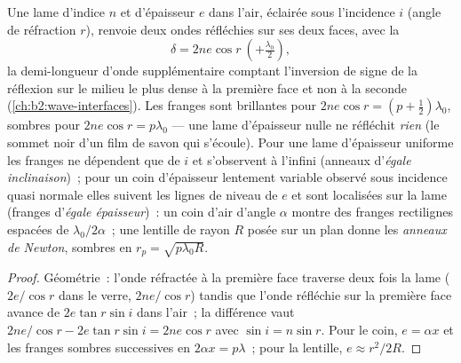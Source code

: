 \begin{proposition}\label{prop:b2:two-wave-interference:film}
Une lame d'indice $n$ et d'épaisseur $e$ dans l'air, éclairée sous l'incidence $i$
(angle de réfraction $r$), renvoie deux ondes réfléchies sur ses deux faces,
avec la 
\[
\delta = 2ne\cos r \ (+\tfrac{\lambda_0}2) ,
\]
la demi-longueur d'onde supplémentaire comptant l'inversion de signe de la réflexion
sur le milieu le plus dense à la première face et non à la seconde
(\cref{ch:b2:wave-interfaces}). Les franges sont brillantes pour $2ne\cos r =
(p + \tfrac12)\lambda_0$, sombres pour $2ne\cos r = p\lambda_0$ --- une lame d'épaisseur
nulle ne réfléchit \emph{rien} (le sommet noir d'un film de savon qui s'écoule).
Pour une lame d'épaisseur uniforme les franges ne dépendent que de $i$
et s'observent à l'infini (anneaux d'\emph{égale inclinaison})~; pour un
coin d'épaisseur lentement variable observé sous incidence quasi normale elles
suivent les lignes de niveau de $e$ et sont localisées sur la lame
(franges d'\emph{égale épaisseur})~: un coin d'air d'angle $\alpha$ montre des
franges rectilignes espacées de $\lambda_0/2\alpha$~; une lentille de rayon $R$ posée sur un plan donne
les \emph{anneaux de Newton}, sombres en $r_p = \sqrt{p\lambda_0R}$.
\end{proposition}

\begin{proof}
Géométrie~: l'onde réfractée à la première face traverse deux fois la lame
($2e/\cos r$ dans le verre,  $2ne/\cos r$) tandis que l'onde réfléchie
sur la première face avance de $2e\tan r\sin i$ dans l'air~; la différence vaut
$2ne/\cos r - 2e\tan r\sin i = 2ne\cos r$ avec $\sin i = n\sin r$. Pour le
coin, $e = \alpha x$ et les franges sombres successives en $2\alpha x = p\lambda$~; pour la
lentille, $e \approx r^2/2R$.
\end{proof}

